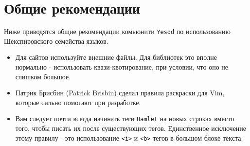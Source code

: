 \section{Общие рекомендации}

Ниже приводятся общие рекомендации комьюнити \texttt{Yesod} по использованию
Шекспировского семейства языков.

\begin{itemize}
    \item Для сайтов используйте внешние файлы. Для библиотек это вполне
        нормально - использовать квази-квотирование, при условии, что оно не
        слишком большое.
    \item Патрик Брисбин (Patrick Brisbin) сделал правила раскраски для Vim,
        которые сильно помогают при разработке.
    \item Вам следует почти всегда начинать теги \texttt{Hamlet} на новых
        строках вместо того, чтобы писать их после существующих тегов.
        Единственное исключение этому правилу - это использование
        \lstinline!<i>! и \lstinline!<b>! тегов в большом блоке текста.
\end{itemize}
